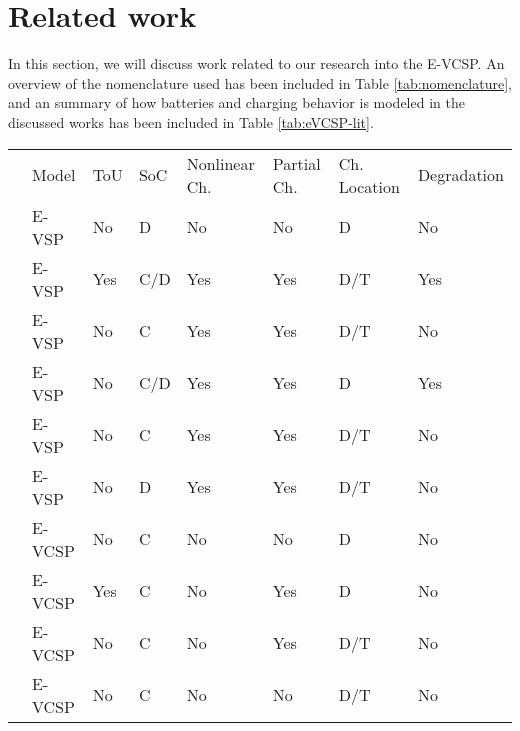 \documentclass[]{article}
\begin{document}
\section{Related work}
In this section, we will discuss work related to our research into the E-VCSP. An overview of the nomenclature used has been included in Table \ref{tab:nomenclature}, and an summary of how batteries and charging behavior is modeled in the discussed works has been included in Table \ref{tab:eVCSP-lit}.
\begin{landscape}
\null
\vfill
\begin{table}[h]
  \centering
  \begin{tabular}{llllllll}
    \toprule
                                     & Model   & ToU & SoC & Nonlinear Ch. & Partial Ch. & Ch. Location & Degradation \\
    \cmidrule(lr){2-8}
    \citet{Li2014}               & E-VSP   & No  & D   & No            & No          & D            & No          \\
    \citet{vanKootenNiekerk2017} & E-VSP   & Yes & C/D & Yes           & Yes         & D/T          & Yes         \\
    \citet{Olsen2020}            & E-VSP   & No  & C   & Yes           & Yes         & D/T          & No          \\
    \citet{Zhang2021}            & E-VSP   & No  & C/D & Yes           & Yes         & D            & Yes         \\
    \citet{Parmentier2023}       & E-VSP   & No  & C   & Yes           & Yes         & D/T          & No          \\
    \citet{deVos2024}            & E-VSP   & No  & D   & Yes           & Yes         & D/T          & No          \\
    \addlinespace[0.4em]
    \citet{Perumal2021}          & E-VCSP  & No  & C   & No            & No          & D            & No          \\
    \citet{Wang2022}             & E-VCSP  & Yes & C   & No            & Yes         & D            & No          \\
    \citet{Sistig2023}           & E-VCSP  & No  & C   & No            & Yes         & D/T          & No          \\
    \citet{Shen2023}             & E-VCSP  & No  & C   & No            & No          & D/T          & No          \\

\end{tabular}
\end{table}
\end{landscape}
\end{document}
